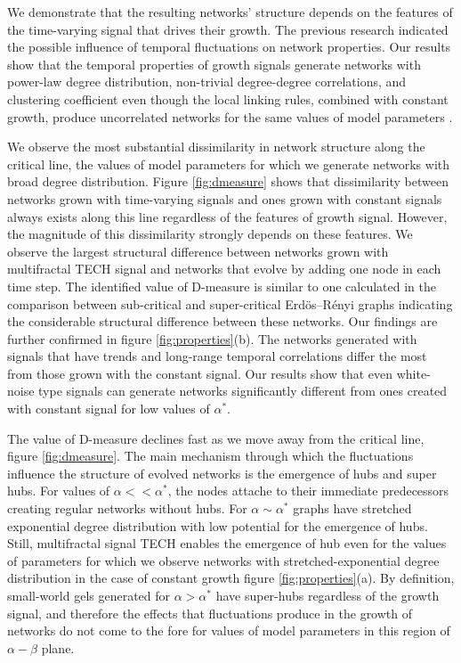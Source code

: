 We demonstrate that the resulting networks' structure depends on the features of the time-varying signal that drives their growth. The previous research \cite{mitrovic2012,mitrovic2015} indicated the possible influence of temporal fluctuations on network properties. Our results show that the temporal properties of growth signals generate networks with power-law degree distribution, non-trivial degree-degree correlations, and clustering coefficient even though the local linking rules, combined with constant growth, produce uncorrelated networks for the same values of model parameters \cite{hajra2004}. 

We observe the most substantial dissimilarity in network structure along the critical line, the values of model parameters for which we generate networks with broad degree distribution. Figure \ref{fig:dmeasure} shows that dissimilarity between networks grown with time-varying signals and ones grown with constant signals always exists along this line regardless of the features of growth signal. However, the magnitude of this dissimilarity strongly depends on these features. We observe the largest structural difference between networks grown with multifractal TECH signal and networks that evolve by adding one node in each time step. The identified value of D-measure is similar to one calculated in the comparison between sub-critical and super-critical Erd\"{o}s–R\'{e}nyi graphs \cite{tiago2} indicating the considerable structural difference between these networks. Our findings are further confirmed in figure \ref{fig:properties}(b). The networks generated with signals that have trends and long-range temporal correlations differ the most from those grown with the constant signal. Our results show that even white-noise type signals can generate networks significantly different from ones created with constant signal for low values of $\alpha^{*}$.

The value of D-measure declines fast as we move away from the critical line, figure \ref{fig:dmeasure}. The main mechanism through which the fluctuations influence the structure of evolved networks is the emergence of hubs and super hubs. For values of $\alpha<<\alpha^{*}$, the nodes attache to their immediate predecessors creating regular networks without hubs. For $\alpha \sim \alpha^{*}$ graphs have stretched exponential degree distribution with low potential for the emergence of hubs. Still, multifractal signal TECH enables the emergence of hub even for the values of parameters for which we observe networks with stretched-exponential degree distribution in the case of constant growth figure \ref{fig:properties}(a). By definition, small-world gels generated for $\alpha>\alpha^{*}$ have super-hubs \cite{hajra2004} regardless of the growth signal, and therefore the effects that fluctuations produce in the growth of networks do not come to the fore for values of model parameters in this region of $\alpha-\beta$ plane.

